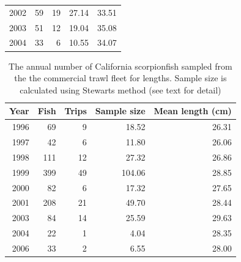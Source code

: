 \documentclass[12pt,]{article}
\begin{document}
\begin{table}[ht]
\begin{tabular}{rrrrr}
  2002 &  59 &  19 & 27.14 & 33.51 \\ 
  2003 &  51 &  12 & 19.04 & 35.08 \\ 
  2004 &  33 &   6 & 10.55 & 34.07 \\ 
   \hline
\end{tabular}
\end{table}\begin{table}[ht]
\centering
\caption{The annual number of California scorpionfish 
                                              sampled from the the commercial trawl 
                                            fleet for lengths. Sample size is calculated 
                                            using Stewarts method (see text for detail)} 
\label{tab:ComTrawl_lengthsample}
\begin{tabular}{rrrrr}
  \hline
Year & Fish & Trips & Sample size & Mean length (cm) \\ 
  \hline
1996 &  69 &   9 & 18.52 & 26.31 \\ 
  1997 &  42 &   6 & 11.80 & 26.06 \\ 
  1998 & 111 &  12 & 27.32 & 26.86 \\ 
  1999 & 399 &  49 & 104.06 & 28.85 \\ 
  2000 &  82 &   6 & 17.32 & 27.65 \\ 
  2001 & 208 &  21 & 49.70 & 28.44 \\ 
  2003 &  84 &  14 & 25.59 & 29.63 \\ 
  2004 &  22 &   1 & 4.04 & 28.35 \\ 
  2006 &  33 &   2 & 6.55 & 28.00 \\ 
   \hline
\end{tabular}
\end{table}

\FloatBarrier
\newpage
\end{document}
